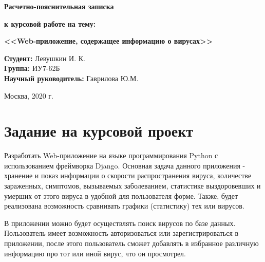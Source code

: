 \documentclass[a4paper,14pt]{extarticle}
\begin{document}
 	\vspace*{30mm}
 	
 	\LARGE
 	\begin{center}
 		\textbf{Расчетно-пояснительная записка}
 		
 		\textbf{к курсовой работе на тему:}
 		
 		\textbf{<<Web-приложение, содержащее информацию о вирусах>>}
 	\end{center}
 	
 	
 	\vspace*{15mm}
 	
 	\large
 	\begin{flushleft}
 		\textbf{Студент:} Левушкин И. К. \\
 		\textbf{Группа:} ИУ7-62Б \\
 		\textbf{Научный руководитель:} Гаврилова Ю.М.
 	\end{flushleft}
 	
 	\vspace*{50mm}
 	
 	\large
 	\begin{center}
 		Москва, 2020 г.
 	\end{center}
 	
 	\thispagestyle{empty}
 	
 	\newpage
 	
 	\section*{Задание на курсовой проект}
 	Разработать Web-приложение на языке программирования Python с использованием фреймворка Django. Основная задача данного приложения - хранение и показ информации о скорости распространения вируса, количестве зараженных, симптомов, вызываемых заболеванием, статистике выздоровевших и умерших от этого вируса в удобной для пользователя форме. Также, будет реализована возможность сравнивать графики (статистику) тех или вирусов. 
 	
 	В приложении можно будет осуществлять поиск вирусов по базе данных. Пользователь имеет возможность авторизоваться или зарегистрироваться в приложении, после этого пользователь сможет добавлять в избранное различную информацию про тот или иной вирус, что он просмотрел.
 	
\end{document}
